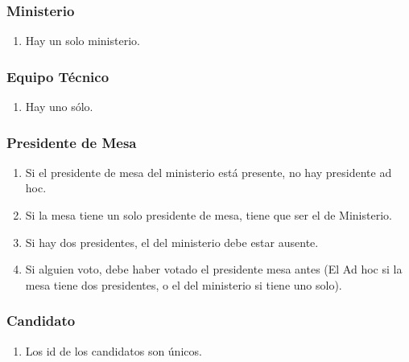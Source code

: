 \subsubsection*{Ministerio}
\begin{enumerate}
\item Hay un solo ministerio.
\end{enumerate}

\subsubsection*{Equipo T\'ecnico}
\begin{enumerate}
\item Hay uno sólo.
\end{enumerate}

\subsubsection*{Presidente de Mesa}
\begin{enumerate}
\item Si el presidente de mesa del ministerio está presente, no hay presidente ad hoc.
\item Si la mesa tiene un solo presidente de mesa, tiene que ser el de Ministerio.
\item Si hay dos presidentes, el del ministerio debe estar ausente.
\item Si alguien voto, debe haber votado el presidente mesa antes (El Ad hoc si la mesa tiene dos presidentes, o el del ministerio si tiene uno solo).
\end{enumerate}

\subsubsection*{Candidato}
\begin{enumerate}
\item Los id de los candidatos son únicos.
\end{enumerate}
